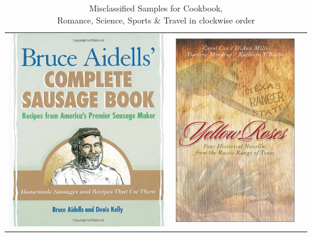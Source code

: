 \documentclass[conference]{IEEEtran}
\begin{document}
\begin{table}[hbtp]
\centering
\caption{Misclassified Samples for Cookbook,\\ Romance, Science, Sports \& Travel in clockwise order}

\begin{center}

\begin{tabular}{c c c}
  \includegraphics[scale=0.2]{pics/non_results_images/food.jpeg} &
  \includegraphics[scale=0.2]{pics/non_results_images/romance.jpeg} &

\end{tabular}
\end{center}
\end{table}
\end{document}
